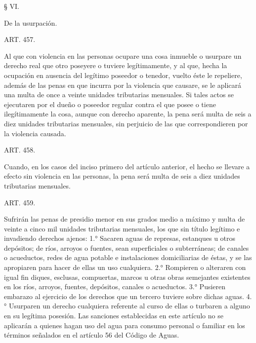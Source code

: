     § VI.

    De la usurpación.





    ART. 457.

    Al que con violencia en las personas ocupare una cosa inmueble o usurpare un derecho real que otro poseyere o tuviere legítimamente, y al que, hecha la ocupación en ausencia del legítimo poseedor o tenedor, vuelto éste le repeliere, además de las penas en que incurra por la violencia que causare, se le aplicará una multa de once a veinte unidades tributarias mensuales.
    Si tales actos se ejecutaren por el dueño o poseedor regular contra el que posee o tiene ilegítimamente la cosa, aunque con derecho aparente, la pena será multa de seis a diez unidades tributarias mensuales, sin perjuicio de las que correspondieren por la violencia causada.






    ART. 458.

    Cuando, en los casos del inciso primero del artículo anterior, el hecho se llevare a efecto sin violencia en las personas, la pena será multa de seis a diez unidades tributarias mensuales.









    ART. 459.

    Sufrirán las penas de presidio menor en sus grados medio a máximo y multa de veinte a cinco mil unidades tributarias mensuales, los que sin título legítimo e invadiendo derechos ajenos:
    1.° Sacaren aguas de represas, estanques u otros depósitos; de ríos, arroyos o fuentes, sean superficiales o subterráneas; de canales o acueductos, redes de agua potable e instalaciones domiciliarias de éstas, y se las apropiaren para hacer de ellas un uso cualquiera.
    2.° Rompieren o alteraren con igual fin diques, esclusas, compuertas, marcos u otras obras semejantes existentes en los ríos, arroyos, fuentes, depósitos, canales o acueductos.
    3.° Pusieren embarazo al ejercicio de los derechos que un tercero tuviere sobre dichas aguas.
    4.° Usurparen un derecho cualquiera referente al curso de ellas o turbaren a alguno en su legítima posesión.
    Las sanciones establecidas en este artículo no se aplicarán a quienes hagan uso del agua para consumo personal o familiar en los términos señalados en el artículo 56 del Código de Aguas.


